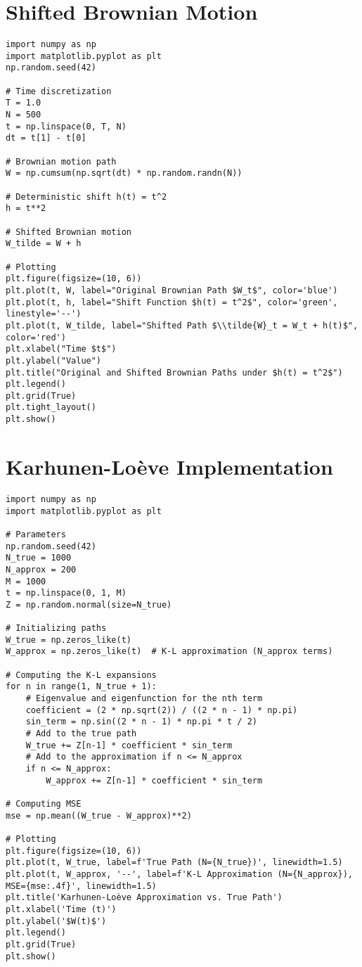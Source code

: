 \documentclass[12pt]{report}
\begin{document}
\section{Shifted Brownian Motion}
\begin{verbatim}
import numpy as np
import matplotlib.pyplot as plt
np.random.seed(42)

# Time discretization
T = 1.0
N = 500
t = np.linspace(0, T, N)
dt = t[1] - t[0]

# Brownian motion path
W = np.cumsum(np.sqrt(dt) * np.random.randn(N))

# Deterministic shift h(t) = t^2
h = t**2

# Shifted Brownian motion
W_tilde = W + h

# Plotting
plt.figure(figsize=(10, 6))
plt.plot(t, W, label="Original Brownian Path $W_t$", color='blue')
plt.plot(t, h, label="Shift Function $h(t) = t^2$", color='green', linestyle='--')
plt.plot(t, W_tilde, label="Shifted Path $\\tilde{W}_t = W_t + h(t)$", color='red')
plt.xlabel("Time $t$")
plt.ylabel("Value")
plt.title("Original and Shifted Brownian Paths under $h(t) = t^2$")
plt.legend()
plt.grid(True)
plt.tight_layout()
plt.show()
\end{verbatim}

\section{Karhunen-Loève Implementation}
\begin{verbatim}
import numpy as np
import matplotlib.pyplot as plt

# Parameters
np.random.seed(42) 
N_true = 1000       
N_approx = 200      
M = 1000           
t = np.linspace(0, 1, M)
Z = np.random.normal(size=N_true)

# Initializing paths
W_true = np.zeros_like(t)    
W_approx = np.zeros_like(t)  # K-L approximation (N_approx terms)

# Computing the K-L expansions
for n in range(1, N_true + 1):
    # Eigenvalue and eigenfunction for the nth term
    coefficient = (2 * np.sqrt(2)) / ((2 * n - 1) * np.pi)
    sin_term = np.sin((2 * n - 1) * np.pi * t / 2)
    # Add to the true path
    W_true += Z[n-1] * coefficient * sin_term
    # Add to the approximation if n <= N_approx
    if n <= N_approx:
        W_approx += Z[n-1] * coefficient * sin_term

# Computing MSE
mse = np.mean((W_true - W_approx)**2)

# Plotting
plt.figure(figsize=(10, 6))
plt.plot(t, W_true, label=f'True Path (N={N_true})', linewidth=1.5)
plt.plot(t, W_approx, '--', label=f'K-L Approximation (N={N_approx}), MSE={mse:.4f}', linewidth=1.5)
plt.title('Karhunen-Loève Approximation vs. True Path')
plt.xlabel('Time (t)')
plt.ylabel('$W(t)$')
plt.legend()
plt.grid(True)
plt.show()
\end{verbatim}
\end{document}
